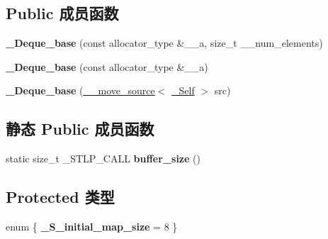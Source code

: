 \subsection*{Public 成员函数}
\begin{DoxyCompactItemize}
\item 
\mbox{\label{class___deque__base_a3434c716e5c6bcbf0773227feb7ae8e6}} 
{\bfseries \+\_\+\+Deque\+\_\+base} (const allocator\+\_\+type \&\+\_\+\+\_\+a, size\+\_\+t \+\_\+\+\_\+num\+\_\+elements)
\item 
\mbox{\label{class___deque__base_a46d126e03a84ddd07fd8189ad12fc113}} 
{\bfseries \+\_\+\+Deque\+\_\+base} (const allocator\+\_\+type \&\+\_\+\+\_\+a)
\item 
\mbox{\label{class___deque__base_af45d46341e13d03dede139201b1dadea}} 
{\bfseries \+\_\+\+Deque\+\_\+base} (\hyperlink{class____move__source}{\+\_\+\+\_\+move\+\_\+source}$<$ \hyperlink{class___deque__base}{\+\_\+\+Self} $>$ src)
\end{DoxyCompactItemize}
\subsection*{静态 Public 成员函数}
\begin{DoxyCompactItemize}
\item 
\mbox{\label{class___deque__base_affa2846a910af9a5701b58a3d9e4f353}} 
static size\+\_\+t \+\_\+\+S\+T\+L\+P\+\_\+\+C\+A\+LL {\bfseries buffer\+\_\+size} ()
\end{DoxyCompactItemize}
\subsection*{Protected 类型}
\begin{DoxyCompactItemize}
\item 
\mbox{\label{class___deque__base_a57a86761cc3b0e8064d70a5c1970a80e}} 
enum \{ {\bfseries \+\_\+\+S\+\_\+initial\+\_\+map\+\_\+size} = 8
 \}
\end{DoxyCompactItemize}
